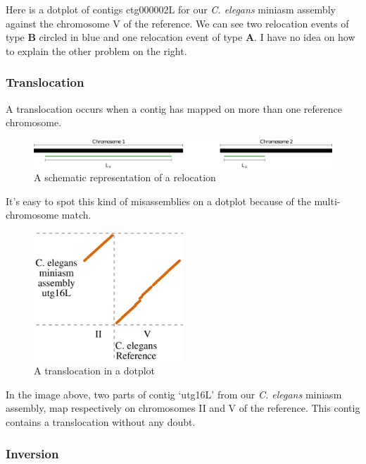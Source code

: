 \documentclass[./main.tex]{subfiles}
\begin{document}
Here is a dotplot of contigs ctg000002L for our \emph{C. elegans}
miniasm assembly against the chromosome V of the reference. We can see
two relocation events of type \textbf{B} circled in blue and one
relocation event of type \textbf{A}. I have no idea on how to explain
the other problem on the right.

\subsubsection{Translocation}\label{translocation}

A translocation occurs when a contig has mapped on more than one
reference chromosome.

\begin{figure}[ht]
\centering
\includegraphics[width=\textwidth]{paper/misassemblies-in-noisy-assemblies/translocation_def.pdf}
\caption{A schematic representation of a relocation}
\end{figure}

It's easy to spot this kind of misassemblies on a dotplot because of the
multi-chromosome match.

\begin{figure}[ht]
\centering
\includegraphics[width=0.5\textwidth]{paper/misassemblies-in-noisy-assemblies/translocation_dotplot_exemple.pdf}
\caption{A translocation in a dotplot}
\end{figure}

In the image above, two parts of contig `utg16L' from our \emph{C.
elegans} miniasm assembly, map respectively on chromosomes II and V of
the reference. This contig contains a translocation without any doubt.

\subsubsection{Inversion}\label{inversion}
\end{document}
